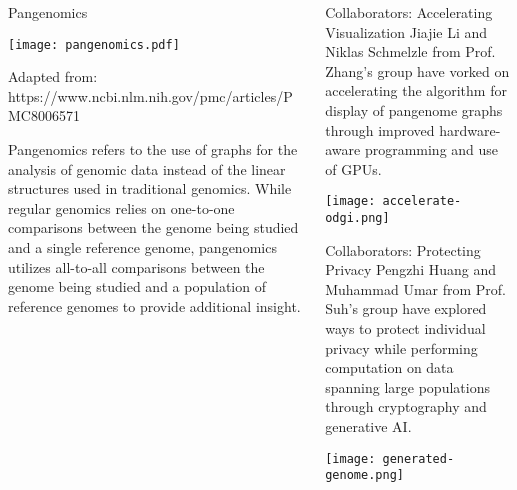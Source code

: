 \documentclass{cbxposter}
\renewcommand{\smallskip}{\vspace{0.16667in}}
\begin{document}
\begin{frame}[fragile,t]{}
\begin{columns}[T]
\begin{column}{10.5in}

\vspace{0.67in}
\begin{block}{Pangenomics}
  \begin{center}
    \texttt{[image: pangenomics.pdf]}
  \end{center}

  Adapted from: https://www.ncbi.nlm.nih.gov/pmc/articles/PMC8006571

  \smallskip

  Pangenomics refers to the use of graphs for the analysis of genomic data
  instead of the linear structures used in traditional genomics. While
  regular genomics relies on one-to-one comparisons between the genome being
  studied and a single reference genome, pangenomics utilizes all-to-all
  comparisons between the genome being studied and a population of reference
  genomes to provide additional insight.
  
\end{block}

\end{column}

\begin{column}{10.5in}
  \vspace{0.4in}

  \begin{block}{Collaborators: Accelerating Visualization}
    \smallskip
    Jiajie Li and Niklas Schmelzle from Prof. Zhang's group have vorked on
    accelerating the algorithm for display of pangenome graphs through
    improved hardware-aware programming and use of GPUs.
    \begin{center}
      \texttt{[image: accelerate-odgi.png]}
    \end{center}
  \end{block}

\vspace{0.67in}
\begin{block}{Collaborators: Protecting Privacy}
    \smallskip
    Pengzhi Huang and Muhammad Umar from Prof. Suh's group have explored
    ways to protect individual privacy while performing computation on data
    spanning large populations through cryptography and generative AI.
    \begin{center}
      \texttt{[image: generated-genome.png]}
    \end{center}
  \end{block}


\end{column}
\end{columns}
\end{frame}
\end{document}
